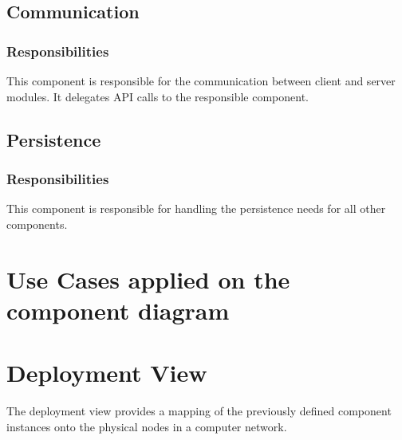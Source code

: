 \documentclass[a4paper,11pt]{report}
\begin{document}
\subsection{Communication}
\subsubsection{Responsibilities}
This component is responsible for the communication between client and server modules. It delegates API calls to the responsible component.

\subsection{Persistence}
\subsubsection{Responsibilities}
This component is responsible for handling the persistence needs for all other components.


\section{Use Cases applied on the component diagram}
\section{Deployment View}
The deployment view provides a mapping of the previously defined component instances onto the physical nodes in a computer network. 
\end{document}
